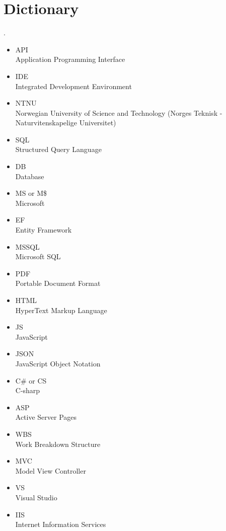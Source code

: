 \section{Dictionary}.
\begin{itemize}
\item API \\ Application Programming Interface
\item IDE \\ Integrated Development Environment
\item NTNU \\ Norwegian University of Science and Technology (Norges Teknisk - Naturvitenskapelige Universitet)
\item SQL \\ Structured Query Language 
\item DB \\ Database 
\item MS or M\$ \\ Microsoft
\item EF \\ Entity Framework
\item MSSQL \\ Microsoft SQL
\item PDF \\ Portable Document Format
\item HTML \\ HyperText Markup Language
\item JS \\ JavaScript
\item JSON \\ JavaScript Object Notation
\item C\# or CS\\ C-sharp
\item ASP \\ Active Server Pages
\item WBS \\ Work Breakdown Structure
\item MVC \\ Model View Controller
\item VS \\ Visual Studio
\item IIS \\Internet Information Services
\end{itemize}




